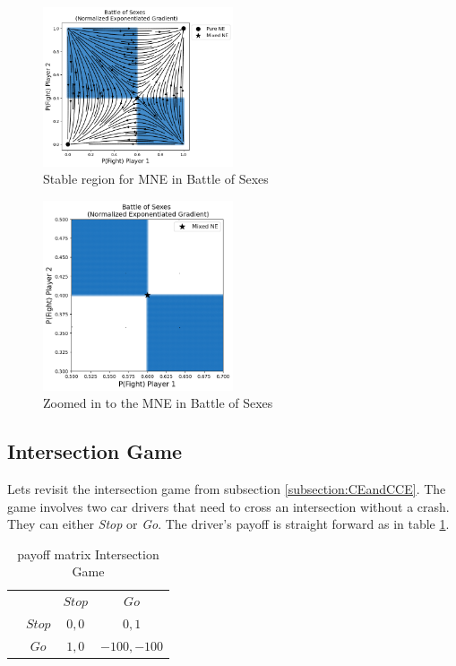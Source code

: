 \begin{figure}[H]
    \centering
    \includegraphics[width=0.5\textwidth]{logos/BattleOfSexes3.png}
    \caption{Stable region for MNE in Battle of Sexes}
    \label{fig:BattleOfSexes3}
\end{figure}

\begin{figure}[H]
    \centering
    \includegraphics[width=0.5\textwidth]{logos/BattleOfSexes4.png}
    \caption{Zoomed in to the MNE in Battle of Sexes}
    \label{fig:BattleOfSexes4}
\end{figure}


\subsection{Intersection Game}\label{subsection:intersectionGame}

Lets revisit the intersection game from subsection \ref{subsection:CEandCCE}. The game involves two car drivers that need to cross an intersection without a crash. They can either \textit{Stop} or \textit{Go}. The driver's payoff is straight forward as in table \ref{tab:payoffIntersection}. 

\begin{table}[H]\centering
\setlength{\extrarowheight}{2pt}
\begin{tabular}{cc|c|c|}
  & \multicolumn{1}{c}{} & \multicolumn{1}{c}{$Stop$}  & \multicolumn{1}{c}{$Go$} \\\cline{3-4}
  & $Stop$ & $0,0$ & $0,1$ \\\cline{3-4}
  & $Go$ & $1,0$ & $-100,-100$ \\\cline{3-4}
\end{tabular}\caption{\label{tab:payoffIntersection}payoff matrix Intersection Game}
\end{table}

